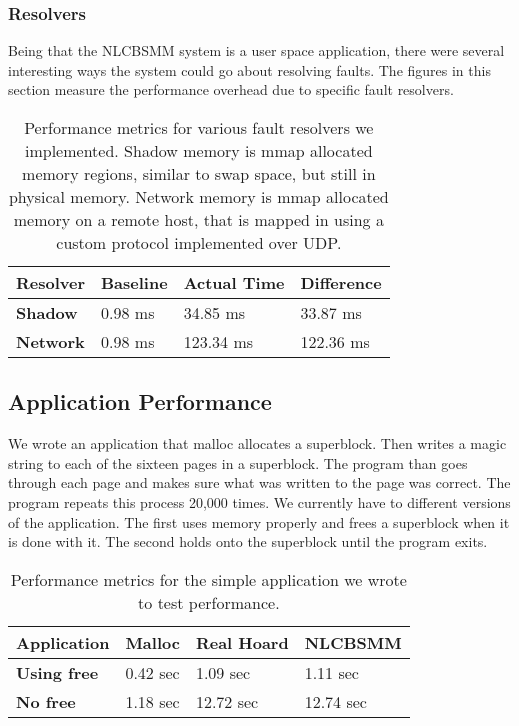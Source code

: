\documentclass[9pt]{sig-alternate-10pt}
\begin{document}
\subsubsection{Resolvers}
Being that the NLCBSMM system is a user space application, there were several interesting ways the system could go about resolving faults.  The figures in this section measure the performance overhead due to specific fault resolvers.

% 
% 
%
\begin{center}
\begin{table}[htb]
\begin{tabular}{|l | l | l | l |}
\hline
\bf{Resolver} & \bf{Baseline} & \bf{Actual Time} & \bf{Difference} \\
\hline
\bf{Shadow} & 0.98 ms & 34.85 ms & 33.87 ms\\
\bf{Network} & 0.98 ms & 123.34 ms & 122.36 ms\\
\hline
\end{tabular}
\caption{Performance metrics for various fault resolvers we implemented.  Shadow memory is mmap allocated memory regions, similar to swap space, but still in physical memory.  Network memory is mmap allocated memory on a remote host, that is mapped in using a custom protocol implemented over UDP.}
\end{table}
\end{center}

\subsection{Application Performance}
We wrote an application that malloc allocates a superblock. Then writes a magic string to each of the sixteen pages in a superblock. The program than goes through each page and makes sure what was written to the page was correct. The program repeats this process 20,000 times. We currently have to different versions of the application. The first uses memory properly and frees a superblock when it is done with it. The second holds onto the superblock until the program exits.
% 
% 
%
\begin{center}
\begin{table}[htb]
\begin{tabular}{|l | l | l | l |}
\hline
\bf{Application} & \bf{Malloc} & \bf{Real Hoard} & \bf{NLCBSMM} \\
\hline
\bf{Using free} & 0.42 sec & 1.09 sec & 1.11 sec\\
\bf{No free} & 1.18 sec & 12.72 sec & 12.74 sec\\
\hline
\end{tabular}
\caption{Performance metrics for the simple application we wrote to test performance.}
\end{table}
\end{center}
\end{document}
